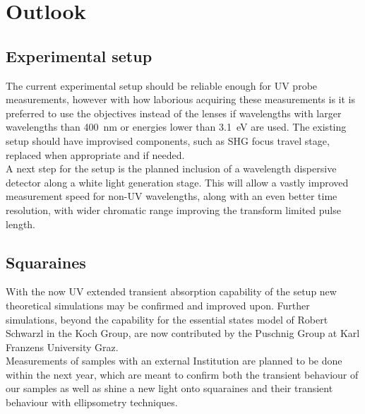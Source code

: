 \documentclass[twoside,openright,listof=numbered]{scrreprt}
\begin{document}
\chapter{Outlook}
\section{Experimental setup}
The current experimental setup should be reliable enough for UV probe measurements, however with how laborious acquiring these measurements is it is preferred to use the objectives instead of the lenses if wavelengths with larger wavelengths than \qty{400}{\nano\meter} or energies lower than \qty{3.1}{\electronvolt} are used. The existing setup should have improvised components, such as SHG focus travel stage, replaced when appropriate and if needed.\\
A next step for the setup is the planned inclusion of a wavelength dispersive detector along a white light generation stage. This will allow a vastly improved measurement speed for non-UV wavelengths, along with an even better time resolution, with wider chromatic range improving the transform limited pulse length.

\section{Squaraines}
With the now UV extended transient absorption capability of the setup new theoretical simulations may be confirmed and improved upon. Further simulations, beyond the capability for the essential states model of Robert Schwarzl in the Koch Group, are now contributed by the Puschnig Group at Karl Franzens University Graz.\\
Measurements of samples with an external Institution are planned to be done within the next year, which are meant to confirm both the transient behaviour of our samples as well as shine a new light onto squaraines and their transient behaviour with ellipsometry techniques.


\setcounter{chapter}{0}
\renewcommand\thechapter{\Alph{chapter}}
\end{document}
